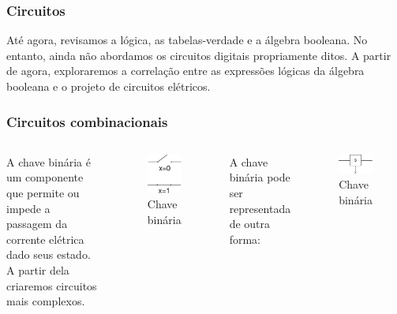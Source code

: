 \begin{frame}
	\frametitle{Circuitos}
	\par Até agora, revisamos a lógica, as tabelas-verdade e a álgebra booleana. No entanto, ainda não abordamos os circuitos digitais propriamente ditos. A partir de agora, exploraremos a correlação entre as expressões lógicas da álgebra booleana e o projeto de circuitos elétricos.
\end{frame}

\begin{frame}
	\frametitle{Circuitos combinacionais}
	\begin{columns}
		\par A chave binária é um componente que permite ou impede a passagem da corrente elétrica dado seus estado. A partir dela criaremos circuitos mais complexos.
		\begin{figure}
			\centering
			\includegraphics[width=0.2\linewidth]{images/chaveBinaria}
			\caption{Chave binária}
			\label{fig:chavebinaria}
		\end{figure}
		\par A chave binária pode ser representada de outra forma:
		\begin{figure}
			\centering
			\includegraphics[width=0.7\linewidth]{images/chaveBinariaAbstrata}
			\caption{Chave binária}
			\label{fig:chavebinariaabstrata}
		\end{figure}
	\end{columns}
\end{frame}

